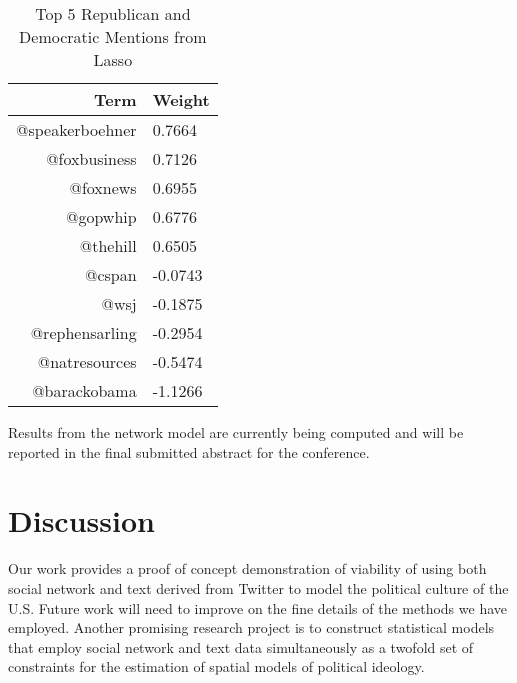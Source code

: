 \documentclass[10pt]{article}
\begin{document}
\begin{table}[htdp]
\caption{Top 5 Republican and Democratic Mentions from Lasso}
\begin{center}
\begin{tabular}{|r|l|}
\hline
Term & Weight \\
\hline
@speakerboehner & 0.7664 \\
@foxbusiness & 0.7126 \\
@foxnews & 0.6955 \\
@gopwhip & 0.6776 \\
@thehill & 0.6505 \\
\hline
@cspan & -0.0743 \\
@wsj & -0.1875 \\
@rephensarling & -0.2954 \\
@natresources & -0.5474 \\
@barackobama & -1.1266 \\
\hline
\end{tabular}
\end{center}
\end{table}

Results from the network model are currently being computed and will be reported in the final submitted abstract for the conference.

\section{Discussion}
Our work provides a proof of concept demonstration of viability of using both social network and text derived from Twitter to model the political culture of the U.S. Future work will need to improve on the fine details of the methods we have employed. Another promising research project is to construct statistical models that employ social network and text data simultaneously as a twofold set of constraints for the estimation of spatial models of political ideology.


\newpage
{}
 
\end{document}
